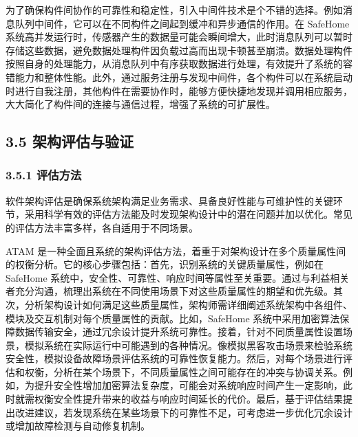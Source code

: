为了确保构件间协作的可靠性和稳定性，引入中间件技术是个不错的选择。例如消息队列中间件，它可以在不同构件之间起到缓冲和异步通信的作用。在 SafeHome 系统高并发运行时，传感器产生的数据量可能会瞬间增大，此时消息队列可以暂时存储这些数据，避免数据处理构件因负载过高而出现卡顿甚至崩溃。数据处理构件按照自身的处理能力，从消息队列中有序获取数据进行处理，有效提升了系统的容错能力和整体性能。此外，通过服务注册与发现中间件，各个构件可以在系统启动时进行自我注册，其他构件在需要协作时，能够方便快捷地发现并调用相应服务，大大简化了构件间的连接与通信过程，增强了系统的可扩展性。

\hypertarget{ux67b6ux6784ux8bc4ux4f30ux4e0eux9a8cux8bc1}{%
\subsection{3.5 架构评估与验证}\label{ux67b6ux6784ux8bc4ux4f30ux4e0eux9a8cux8bc1}}

\hypertarget{ux8bc4ux4f30ux65b9ux6cd5}{%
\subsubsection{3.5.1 评估方法}\label{ux8bc4ux4f30ux65b9ux6cd5}}

软件架构评估是确保系统架构满足业务需求、具备良好性能与可维护性的关键环节，采用科学有效的评估方法能及时发现架构设计中的潜在问题并加以优化。常见的评估方法丰富多样，各自适用于不同场景。


ATAM 是一种全面且系统的架构评估方法，着重于对架构设计在多个质量属性间的权衡分析。它的核心步骤包括：首先，识别系统的关键质量属性，例如在 SafeHome 系统中，安全性、可靠性、响应时间等属性至关重要。通过与利益相关者充分沟通，梳理出系统在不同使用场景下对这些质量属性的期望和优先级。其次，分析架构设计如何满足这些质量属性，架构师需详细阐述系统架构中各组件、模块及交互机制对每个质量属性的贡献。比如，SafeHome 系统中采用加密算法保障数据传输安全，通过冗余设计提升系统可靠性。接着，针对不同质量属性设置场景，模拟系统在实际运行中可能遇到的各种情况。像模拟黑客攻击场景来检验系统安全性，模拟设备故障场景评估系统的可靠性恢复能力。然后，对每个场景进行评估和权衡，分析在某个场景下，不同质量属性之间可能存在的冲突与协调关系。例如，为提升安全性增加加密算法复杂度，可能会对系统响应时间产生一定影响，此时就需权衡安全性提升带来的收益与响应时间延长的代价。最后，基于评估结果提出改进建议，若发现系统在某些场景下的可靠性不足，可考虑进一步优化冗余设计或增加故障检测与自动修复机制。



